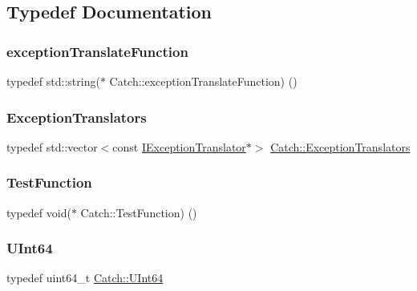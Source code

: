 \subsection{Typedef Documentation}
\mbox{\label{namespace_catch_a14edb319150d3e108bbdef994f9eec2a}} 
\subsubsection{\texorpdfstring{exception\+Translate\+Function}{exceptionTranslateFunction}}
{\footnotesize\ttfamily typedef std\+::string($\ast$ Catch\+::exception\+Translate\+Function) ()}

\mbox{\label{namespace_catch_ae0442a3627f91437716106138b5f540b}} 
\subsubsection{\texorpdfstring{Exception\+Translators}{ExceptionTranslators}}
{\footnotesize\ttfamily typedef std\+::vector$<$const \mbox{\hyperlink{struct_catch_1_1_i_exception_translator}{I\+Exception\+Translator}}$\ast$$>$ \mbox{\hyperlink{namespace_catch_ae0442a3627f91437716106138b5f540b}{Catch\+::\+Exception\+Translators}}}

\mbox{\label{namespace_catch_a26414f52d0835939fae52aadd27e6257}} 
\subsubsection{\texorpdfstring{Test\+Function}{TestFunction}}
{\footnotesize\ttfamily typedef void($\ast$ Catch\+::\+Test\+Function) ()}

\mbox{\label{namespace_catch_a47aaf167582b2a30e5acd3bd874deb05}} 
\subsubsection{\texorpdfstring{U\+Int64}{UInt64}}
{\footnotesize\ttfamily typedef uint64\+\_\+t \mbox{\hyperlink{namespace_catch_a47aaf167582b2a30e5acd3bd874deb05}{Catch\+::\+U\+Int64}}}



